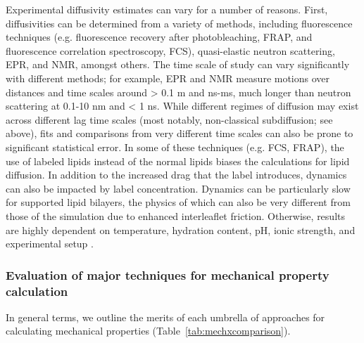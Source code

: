 \documentclass[9pt,bestpractices]{livecoms}
\begin{document}
Experimental diffusivity estimates can vary for a number of reasons.
First, diffusivities can be determined from a variety of methods, including fluorescence techniques (e.g. fluorescence recovery after photobleaching, FRAP, and fluorescence correlation spectroscopy, FCS), quasi-elastic neutron scattering, EPR, and NMR, amongst others.
The time scale of study can vary significantly with different methods; for example, EPR and NMR measure motions over distances and time scales around > 0.1 m and ns-ms, much longer than neutron scattering at 0.1-10 nm and < 1 ns.
While different regimes of diffusion may exist across different lag time scales (most notably, non-classical subdiffusion; see above), fits and comparisons from very different time scales can also be prone to significant statistical error.
In some of these techniques (e.g. FCS, FRAP), the use of labeled lipids instead of the normal lipids biases the calculations for lipid diffusion.
In addition to the increased drag that the label introduces, dynamics can also be impacted by label concentration.
Dynamics can be particularly slow for supported lipid bilayers, the physics of which can also be very different from those of the simulation due to enhanced interleaflet friction.
Otherwise, results are highly dependent on temperature, hydration content, pH, ionic strength, and experimental setup \cite{Poger2016}.

\subsubsection{Evaluation of major techniques for mechanical property calculation}
\label{subsubsec:mecheval}
In general terms, we outline the merits of each umbrella of approaches for calculating mechanical properties (Table~\ref{tab:mechxcomparison}).
\end{document}

